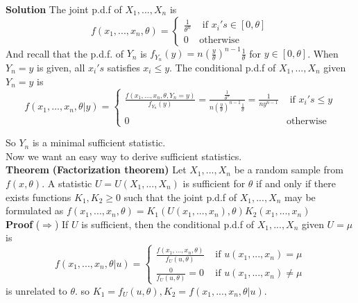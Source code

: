 \documentclass[a4paper,12pt]{article}
\begin{document}
\textbf{Solution} The joint p.d.f of $X_1, ..., X_n$ is
$$f(x_1, ..., x_n, \theta) = 
\begin{cases}
\frac{1}{\theta^n} & \text{ if } x_i's \in [0, \theta]\\
0 & \text{otherwise}
\end{cases}$$
And recall that the p.d.f. of $Y_n$ is $f_{Y_n}(y) = n(\frac{y}{\theta})^{n-1}\frac{1}{\theta}$ for $y\in[0,\theta]$. When $Y_n = y$ is given, all $x_i's$ satisfies $x_i \leq y$. The conditional p.d.f of $X_1, ..., X_n$ given $Y_n = y$ is
$$f(x_1, ..., x_n, \theta | y) = 
\begin{cases}
\frac{f(x_1, ..., x_n, \theta, Y_n = y)}{f_{Y_n}(y)} =
 \frac{\frac{1}{\theta^n}}{n(\frac{y}{\theta})^{n-1}\frac{1}{\theta}} = \frac{1}{ny^{n-1}} & \text{ if } x_i's \leq y\\
0 & \text{otherwise}
\end{cases}$$

So $Y_n$ is a minimal sufficient statistic.\\

Now we want an easy way to derive sufficient statistics.\\

\textbf{Theorem} \textbf{(Factorization theorem)} Let $X_1, ..., X_n$ be a random sample from $f(x, \theta)$. A statistic $U = U(X_1, ..., X_n)$ is sufficient for $\theta$ if and only if there exists functions $K_1, K_2 \geq 0$ such that the joint p.d.f of $X_1, ..., X_n$ may be formulated as $f(x_1, ..., x_n, \theta) = K_1(U(x_1, ..., x_n), \theta)K_2(x_1, ..., x_n)$\\

\textbf{Proof} ($\Rightarrow$) If $U$ is sufficient, then the conditional p.d.f of $X_1, ..., X_n$ given $U=\mu$ is
$$f( x_1, ..., x_n, \theta | u ) = 
\begin{cases}
\frac{f(x_1, ..., x_n, \theta)}{f_U(u, \theta)} & \text{ if } u(x_1, ..., x_n) = \mu \\
\frac{0}{f_U(u, \theta)} = 0 & \text{ if } u(x_1, ..., x_n) \neq \mu
\end{cases}$$
is unrelated to $\theta$. so $K_1 = f_U(u, \theta), K_2 = f(x_1, ..., x_n, \theta | u)$.\\
\end{document}
